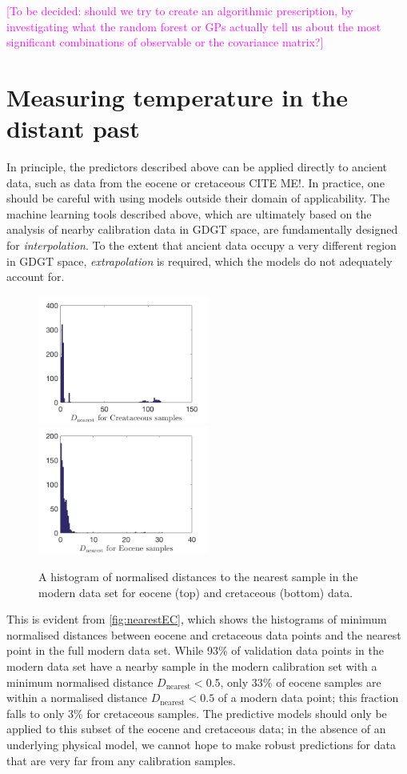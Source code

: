 \documentclass[rmp,aps,twocolumn]{revtex4-1}
\newcommand{\citeme}{{\color{blue} CITE ME!}}
\newcommand{\ilya}[1]{\textcolor{magenta}{#1}}
\begin{document}
\ilya{[To be decided: should we try to create an algorithmic prescription, by investigating what the random forest or GPs actually tell us about the most significant combinations of observable or the covariance matrix?]} 


\section{Measuring temperature in the distant past}

In principle, the predictors described above can be applied directly to ancient data, such as data from the eocene or cretaceous \citeme.  In practice, one should be careful with using models outside their domain of applicability.  The machine learning tools described above, which are ultimately based on the analysis of nearby calibration data in GDGT space, are fundamentally designed for {\it interpolation}.  To the extent that ancient data occupy a very different region in GDGT space, {\it extrapolation} is required, which the models do not adequately account for.

\begin{figure}
	\centering
	\includegraphics[width=0.5\textwidth]{nearestE.png}
	\includegraphics[width=0.5\textwidth]{nearestC.png}
	\caption{\label{fig:nearestEC}  A histogram of normalised distances to the nearest sample in the modern data set for eocene (top) and cretaceous (bottom) data.}
\end{figure}

This is evident from \autoref{fig:nearestEC}, which shows the histograms of minimum normalised distances between eocene and cretaceous data points and the nearest point in the full modern data set.  While 93\% of validation data points in the modern data set have a nearby sample in the modern calibration set with a minimum normalised distance $D_\textrm{nearest}<0.5$, only 33\% of eocene samples are within a normalised distance $D_\textrm{nearest}<0.5$ of a modern data point; this fraction falls to only 3\% for cretaceous samples.  The predictive models should only be applied to this subset of the eocene and cretaceous data; in the absence of an underlying physical model, we cannot hope to make robust predictions for data that are very far from any calibration samples.
\end{document}
